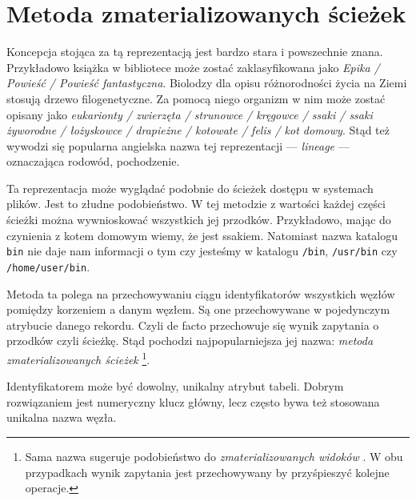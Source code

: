 \section{Metoda zmaterializowanych ścieżek}


Koncepcja stojąca za tą reprezentacją jest bardzo stara i powszechnie znana.
Przykładowo książka w bibliotece może zostać zaklasyfikowana jako \textit{Epika / Powieść / Powieść fantastyczna}.
Biolodzy dla opisu różnorodności życia na Ziemi stosują drzewo filogenetyczne.
Za pomocą niego organizm w nim może zostać opisany jako
\textit{eukarionty / zwierzęta / strunowce / kręgowce / ssaki / ssaki żyworodne / łożyskowce / drapieżne / kotowate / felis / kot domowy}.
Stąd też wywodzi się popularna angielska nazwa tej reprezentacji --- \textit{lineage} --- oznaczająca rodowód, pochodzenie.


    Ta reprezentacja może wyglądać podobnie do ścieżek dostępu w systemach plików.
    Jest to złudne podobieństwo.
    W tej metodzie z wartości każdej części ścieżki można wywnioskować wszystkich jej przodków.
    Przykładowo, mając do czynienia z kotem domowym wiemy, że jest ssakiem.
    Natomiast nazwa katalogu \texttt{bin} nie daje nam informacji o tym czy jesteśmy w katalogu \texttt{/bin}, \texttt{/usr/bin} czy \texttt{/home/user/bin}.



Metoda ta polega na przechowywaniu ciągu identyfikatorów wszystkich węzłów pomiędzy korzeniem a danym węzłem.
Są one przechowywane w pojedynczym atrybucie danego rekordu.
Czyli de facto przechowuje się wynik zapytania o przodków czyli ścieżkę.
Stąd pochodzi najpopularniejsza jej nazwa: \emph{metoda zmaterializowanych ścieżek} \footnote{
    Sama nazwa sugeruje podobieństwo do \emph{zmaterializowanych widoków} .
    W obu przypadkach wynik zapytania jest przechowywany by przyśpieszyć kolejne operacje.
}.


Identyfikatorem może być dowolny, unikalny atrybut  tabeli.
Dobrym rozwiązaniem jest numeryczny klucz główny, lecz często bywa też stosowana unikalna nazwa węzła.


